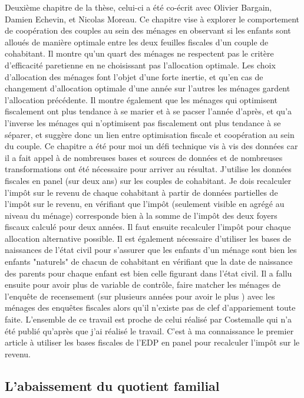 Deuxième chapitre de la thèse, celui-ci a été co-écrit avec Olivier Bargain, Damien Echevin, et Nicolas Moreau. Ce chapitre vise à explorer le comportement de coopération des couples au sein des ménages en observant si les enfants sont alloués de manière optimale entre les deux feuilles fiscales d'un couple de cohabitant. Il montre qu'un quart des ménages ne respectent pas le critère d'efficacité paretienne en ne choisissant pas l'allocation optimale.
Les choix d'allocation des ménages font l'objet d'une forte inertie, et qu'en cas de changement d'allocation optimale d'une année sur l'autres les ménages gardent l'allocation précédente. Il montre également que les ménages qui optimisent fiscalement ont plus tendance à se marier et à se pacser l'année d'après, et qu'a l'inverse les ménages qui n'optimisent pas fiscalement ont plus tendance à se séparer, et suggère donc un lien entre optimisation fiscale et coopération au sein du couple.
Ce chapitre a été pour moi un défi technique vis à vis des données car il a fait appel à de nombreuses bases et sources de données et de nombreuses transformations ont été nécessaire pour arriver au résultat. 
J'utilise les données fiscales en panel (sur deux ans) sur les couples de cohabitant. Je dois recalculer l'impôt sur le revenu de chaque cohabitant à partir de données partielles de l'impôt sur le revenu, en vérifiant que l'impôt (seulement visible en agrégé au niveau du ménage) corresponde bien à la somme de l'impôt des deux foyers fiscaux calculé pour deux années. Il faut ensuite recalculer l'impôt pour chaque allocation alternative possible. Il est également nécessaire d'utiliser les bases de naissances de l'état civil pour s'assurer que les enfants d'un ménage sont bien les enfants "naturels" de chacun de cohabitant en vérifiant que la date de naissance des parents pour chaque enfant est bien celle figurant dans l'état civil. Il a fallu ensuite pour avoir plus de variable de contrôle, faire matcher les ménages de l'enquête de recensement (sur plusieurs années pour avoir le plus ) avec les ménages des enquêtes fiscales alors qu'il n'existe pas de clef d'appariement toute faite. L'ensemble de ce travail est proche de celui réalisé par Costemalle qui n'a été publié qu'après que j'ai réalisé le travail. C'est à ma connaissance le premier article à utiliser les bases fiscales de l'EDP en panel pour recalculer l'impôt sur le revenu.




 \subsection{L'abaissement du quotient familial}

